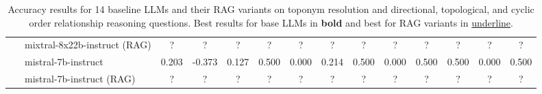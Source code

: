 \begin{table*}[ht]
\begin{tabular}{r|lccc|ccc|ccc|ccc}
         ~      & mixtral-8x22b-instruct (RAG) & ?              & ?      & ?     & ?     & ?      & ?     & ?     & ?     & ?     & ?     & ?      & ?     \\ 
        ~       & mistral-7b-instruct          & 0.203 & -0.373 & 0.127 & 0.500 & 0.000  & 0.214 & 0.500 & 0.000 & 0.500 & 0.500 & 0.000  & 0.500 \\ 
         ~      & mistral-7b-instruct (RAG)    & ?              & ?      & ?     & ?     & ?      & ?     & ?     & ?     & ?     & ?     & ?      & ?     \\ 
    \hline
    \hline
    \end{tabular}
    \caption{Accuracy results for 14 baseline LLMs and their RAG variants on toponym resolution and directional, topological, and cyclic order relationship reasoning questions. Best results for base LLMs in \textbf{bold} and best for RAG variants in \underline{underline}. }
    \label{tab:models}
\end{table*}

\endgroup